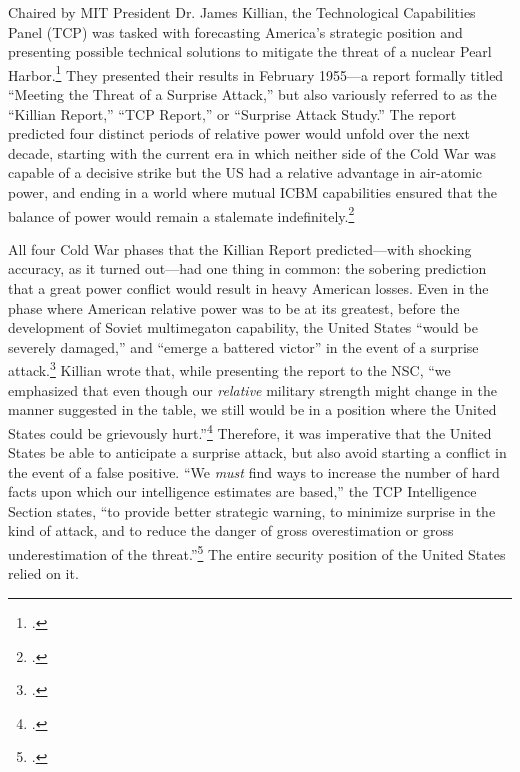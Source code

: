 \documentclass{report}
\begin{document}
Chaired by MIT President Dr. James Killian, the Technological Capabilities Panel (TCP) was tasked with forecasting America's strategic position and presenting possible technical solutions to mitigate the threat of a nuclear Pearl Harbor.\footcite[p.~115]{mcdougall_heavens_1985} They presented their results in February 1955---a report formally titled ``Meeting the Threat of a Surprise Attack,'' but also variously referred to as the ``Killian Report,'' ``TCP Report,'' or ``Surprise Attack Study.'' The report predicted four distinct periods of relative power would unfold over the next decade, starting with the current era in which neither side of the Cold War was capable of a decisive strike but the US had a relative advantage in air-atomic power, and ending in a world where mutual ICBM capabilities ensured that the balance of power would remain a stalemate indefinitely.\footcite[p.~116]{mcdougall_heavens_1985}

All four Cold War phases that the Killian Report predicted---with shocking accuracy, as it turned out---had one thing in common: the sobering prediction that a great power conflict would result in heavy American losses. Even in the phase where American relative power was to be at its greatest, before the development of Soviet multimegaton capability, the United States ``would be severely damaged,'' and ``emerge a battered victor'' in the event of a surprise attack.\footcite{technological_capabilities_panel_meeting_1955} Killian wrote that, while presenting the report to the NSC, ``we emphasized that even though our \emph{relative} military strength might change in the manner suggested in the table, we still would be in a position where the United States could be grievously hurt.''\footcite[p.~75]{killian_sputnik_1977} Therefore, it was imperative that the United States be able to anticipate a surprise attack, but also avoid starting a conflict in the event of a false positive. ``We \emph{must} find ways to increase the number of hard facts upon which our intelligence estimates are based,'' the TCP Intelligence Section states, ``to provide better strategic warning, to minimize surprise in the kind of attack, and to reduce the danger of gross overestimation or gross underestimation of the threat.''\footcite{technological_capabilities_panel_meeting_1955} The entire security position of the United States relied on it.
\end{document}
